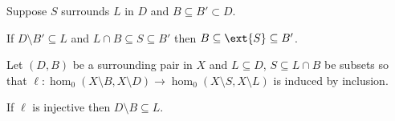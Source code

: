 %

\begin{lemma}\label{lem:surround_and_cover}
  Suppose $S$ surrounds $L$ in $D$ and $B\subseteq B'\subset D$.

  If $D\setminus B'\subseteq L$ and $L\cap B\subseteq S\subseteq B'$ then $B\subseteq \ext{S}\subseteq B'$.
\end{lemma}


\begin{lemma}\label{lem:coverage}
  Let $(D, B)$ be a surrounding pair in $X$ and $L\subseteq D$, $S\subseteq L\cap B$ be subsets so that $\ell: \hom_0(X\setminus B, X\setminus D)\to \hom_0(X\setminus S, X\setminus L)$ is induced by inclusion.

  If $\ell$ is injective then $D\setminus B\subseteq L$.
\end{lemma}

